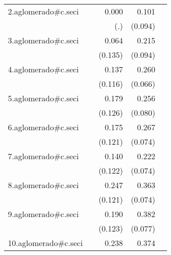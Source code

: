 {\begin{longtable}{l*{4}{D{.}{.}{-1}}}
\addlinespace
2.aglomerado#c.seci&                     &       0.000         &       0.101         &                     \\
            &                     &         (.)         &     (0.094)         &                     \\
\addlinespace
3.aglomerado#c.seci&                     &       0.064         &       0.215\sym{*}  &                     \\
            &                     &     (0.135)         &     (0.094)         &                     \\
\addlinespace
4.aglomerado#c.seci&                     &       0.137         &       0.260\sym{***}&                     \\
            &                     &     (0.116)         &     (0.066)         &                     \\
\addlinespace
5.aglomerado#c.seci&                     &       0.179         &       0.256\sym{**} &                     \\
            &                     &     (0.126)         &     (0.080)         &                     \\
\addlinespace
6.aglomerado#c.seci&                     &       0.175         &       0.267\sym{***}&                     \\
            &                     &     (0.121)         &     (0.074)         &                     \\
\addlinespace
7.aglomerado#c.seci&                     &       0.140         &       0.222\sym{**} &                     \\
            &                     &     (0.122)         &     (0.074)         &                     \\
\addlinespace
8.aglomerado#c.seci&                     &       0.247\sym{*}  &       0.363\sym{***}&                     \\
            &                     &     (0.121)         &     (0.074)         &                     \\
\addlinespace
9.aglomerado#c.seci&                     &       0.190         &       0.382\sym{***}&                     \\
            &                     &     (0.123)         &     (0.077)         &                     \\
\addlinespace
10.aglomerado#c.seci&                     &       0.238\sym{*}  &       0.374\sym{***}&                     \\

\end{longtable}}
